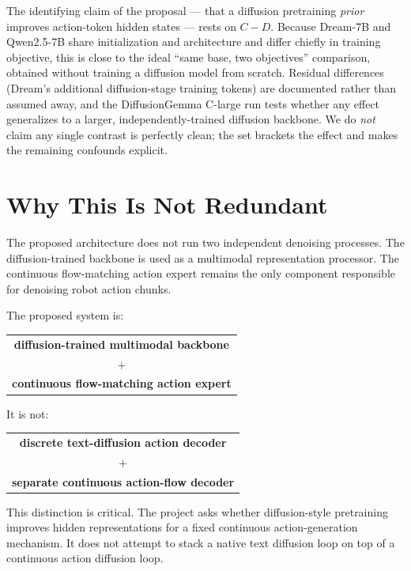 \documentclass[11pt]{article}
\begin{document}
The identifying claim of the proposal --- that a diffusion pretraining \emph{prior} improves action-token hidden states --- rests on $C - D$. Because Dream-7B and Qwen2.5-7B share initialization and architecture and differ chiefly in training objective, this is close to the ideal ``same base, two objectives'' comparison, obtained without training a diffusion model from scratch. Residual differences (Dream's additional diffusion-stage training tokens) are documented rather than assumed away, and the DiffusionGemma \mbox{C-large} run tests whether any effect generalizes to a larger, independently-trained diffusion backbone. We do \emph{not} claim any single contrast is perfectly clean; the set brackets the effect and makes the remaining confounds explicit.

\section{Why This Is Not Redundant}

The proposed architecture does not run two independent denoising processes. The diffusion-trained backbone is used as a multimodal representation processor. The continuous flow-matching action expert remains the only component responsible for denoising robot action chunks.

The proposed system is:

\begin{center}
\begin{tabular}{c}
\textbf{diffusion-trained multimodal backbone} \\
$+$ \\
\textbf{continuous flow-matching action expert}
\end{tabular}
\end{center}

It is not:

\begin{center}
\begin{tabular}{c}
\textbf{discrete text-diffusion action decoder} \\
$+$ \\
\textbf{separate continuous action-flow decoder}
\end{tabular}
\end{center}

This distinction is critical. The project asks whether diffusion-style pretraining improves hidden representations for a fixed continuous action-generation mechanism. It does not attempt to stack a native text diffusion loop on top of a continuous action diffusion loop.
\end{document}
